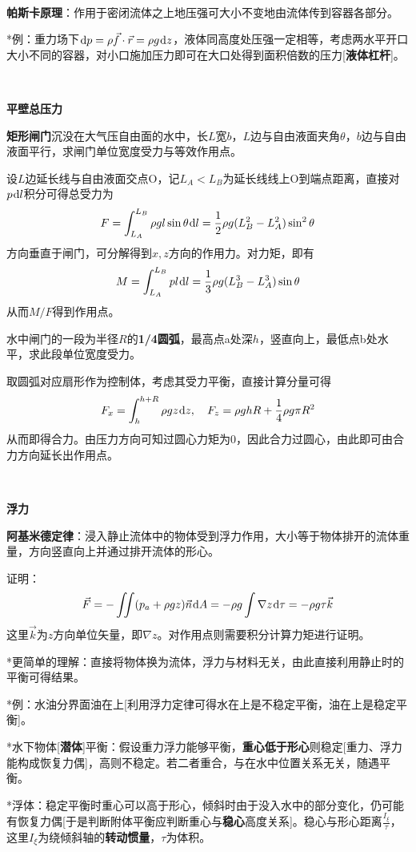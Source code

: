 \documentclass[a4paper,UTF8,fontset=windows]{ctexart}
\newcommand*{\dr}{\hspace{0.07em}\mathrm{d}}
\begin{document}
\

\textbf{帕斯卡原理}：作用于密闭流体之上地压强可大小不变地由流体传到容器各部分。

*例：重力场下$\dr p=\rho\vec{f}\cdot\vec{r}=\rho g\dr z$，液体同高度处压强一定相等，考虑两水平开口大小不同的容器，对小口施加压力即可在大口处得到面积倍数的压力[\textbf{液体杠杆}]。

\

\textbf{平壁总压力}

\textbf{矩形闸门}沉没在大气压自由面的水中，长$L$宽$b$，$L$边与自由液面夹角$\theta$，$b$边与自由液面平行，求闸门单位宽度受力与等效作用点。

设$L$边延长线与自由液面交点O，记$L_A<L_B$为延长线线上O到端点距离，直接对$p\dr l$积分可得总受力为
$$F=\int_{L_A}^{L_B}\rho gl\sin\theta\dr l=\frac{1}{2}\rho g(L_B^2-L_A^2)\sin^2\theta$$
方向垂直于闸门，可分解得到$x,z$方向的作用力。对力矩，即有
$$M=\int_{L_A}^{L_B}pl\dr l=\frac{1}{3}\rho g(L_B^3-L_A^3)\sin\theta$$
从而$M/F$得到作用点。

水中闸门的一段为半径$R$的\textbf{1/4圆弧}，最高点a处深$h$，竖直向上，最低点b处水平，求此段单位宽度受力。

取圆弧对应扇形作为控制体，考虑其受力平衡，直接计算分量可得
$$F_x=\int_h^{h+R}\rho gz\dr z,\quad F_z=\rho ghR+\frac{1}{4}\rho g\pi R^2$$
从而即得合力。由压力方向可知过圆心力矩为0，因此合力过圆心，由此即可由合力方向延长出作用点。

\

\textbf{浮力}

\textbf{阿基米德定律}：浸入静止流体中的物体受到浮力作用，大小等于物体排开的流体重量，方向竖直向上并通过排开流体的形心。

证明：
$$\vec{F}=-\iint(p_a+\rho gz)\vec{n}\dr A=-\rho g\int\nabla z\dr\tau=-\rho g\tau\vec{k}$$
这里$\vec{k}$为$z$方向单位矢量，即$\nabla z$。对作用点则需要积分计算力矩进行证明。

*更简单的理解：直接将物体换为流体，浮力与材料无关，由此直接利用静止时的平衡可得结果。

*例：水油分界面油在上[利用浮力定律可得水在上是不稳定平衡，油在上是稳定平衡]。

*水下物体[\textbf{潜体}]平衡：假设重力浮力能够平衡，\textbf{重心低于形心}则稳定[重力、浮力能构成恢复力偶]，高则不稳定。若二者重合，与在水中位置关系无关，随遇平衡。

*浮体：稳定平衡时重心可以高于形心，倾斜时由于没入水中的部分变化，仍可能有恢复力偶[于是判断附体平衡应判断重心与\textbf{稳心}高度关系]。稳心与形心距离$\frac{I_\xi}{\tau}$，这里$I_\xi$为绕倾斜轴的\textbf{转动惯量}，$\tau$为体积。
\end{document}
